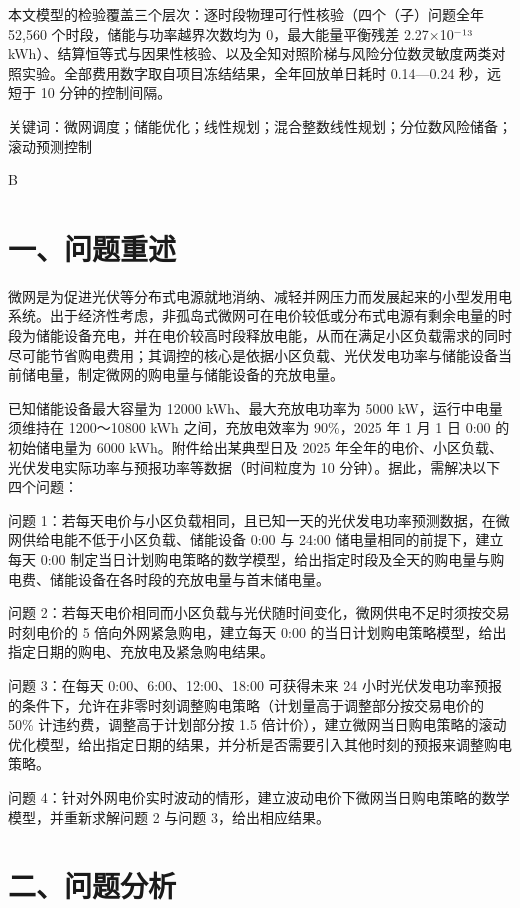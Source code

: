 \documentclass[12pt,a4paper]{ctexart}
\begin{document}
本文模型的检验覆盖三个层次：逐时段物理可行性核验（四个（子）问题全年 52,560 个时段，储能与功率越界次数均为 0，最大能量平衡残差 2.27$\times$10$^{-}$¹³ kWh）、结算恒等式与因果性核验、以及全知对照阶梯与风险分位数灵敏度两类对照实验。全部费用数字取自项目冻结结果，全年回放单日耗时 0.14—0.24 秒，远短于 10 分钟的控制间隔。

关键词：微网调度；储能优化；线性规划；混合整数线性规划；分位数风险储备；滚动预测控制

B

\section*{一、问题重述}

微网是为促进光伏等分布式电源就地消纳、减轻并网压力而发展起来的小型发用电系统。出于经济性考虑，非孤岛式微网可在电价较低或分布式电源有剩余电量的时段为储能设备充电，并在电价较高时段释放电能，从而在满足小区负载需求的同时尽可能节省购电费用；其调控的核心是依据小区负载、光伏发电功率与储能设备当前储电量，制定微网的购电量与储能设备的充放电量。

已知储能设备最大容量为 12000 kWh、最大充放电功率为 5000 kW，运行中电量须维持在 1200～10800 kWh 之间，充放电效率为 90\%，2025 年 1 月 1 日 0:00 的初始储电量为 6000 kWh。附件给出某典型日及 2025 年全年的电价、小区负载、光伏发电实际功率与预报功率等数据（时间粒度为 10 分钟）。据此，需解决以下四个问题：

问题 1：若每天电价与小区负载相同，且已知一天的光伏发电功率预测数据，在微网供给电能不低于小区负载、储能设备 0:00 与 24:00 储电量相同的前提下，建立每天 0:00 制定当日计划购电策略的数学模型，给出指定时段及全天的购电量与购电费、储能设备在各时段的充放电量与首末储电量。

问题 2：若每天电价相同而小区负载与光伏随时间变化，微网供电不足时须按交易时刻电价的 5 倍向外网紧急购电，建立每天 0:00 的当日计划购电策略模型，给出指定日期的购电、充放电及紧急购电结果。

问题 3：在每天 0:00、6:00、12:00、18:00 可获得未来 24 小时光伏发电功率预报的条件下，允许在非零时刻调整购电策略（计划量高于调整部分按交易电价的 50\% 计违约费，调整高于计划部分按 1.5 倍计价），建立微网当日购电策略的滚动优化模型，给出指定日期的结果，并分析是否需要引入其他时刻的预报来调整购电策略。

问题 4：针对外网电价实时波动的情形，建立波动电价下微网当日购电策略的数学模型，并重新求解问题 2 与问题 3，给出相应结果。

\section*{二、问题分析}
\end{document}
